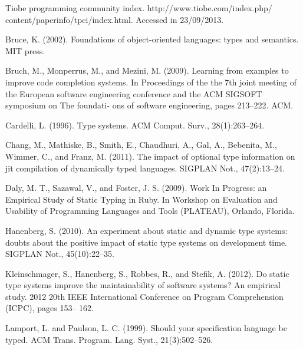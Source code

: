 \documentclass[preprint]{sigplanconf}
\begin{document}
%
%

\renewcommand{\bibfont}{\normalsize}
\begin{thebibliography}{}
\softraggedright

Tiobe programming community index. http://www.tiobe.com/index.php/ content/paperinfo/tpci/index.html. Accessed in 23/09/2013.

Bruce, K. (2002). Foundations of object-oriented languages: types and semantics. MIT press.

Bruch, M., Monperrus, M., and Mezini, M. (2009). Learning from examples to improve code completion systems. In Proceedings of the the 7th joint meeting of the European software engineering conference and the ACM SIGSOFT symposium on The foundati- ons of software engineering, pages 213–222. ACM.

Cardelli, L. (1996). Type systems. ACM Comput. Surv., 28(1):263–264.

Chang, M., Mathiske, B., Smith, E., Chaudhuri, A., Gal, A., Bebenita, M., Wimmer, C., and Franz, M. (2011). The impact of optional type information on jit compilation of dynamically typed languages. SIGPLAN Not., 47(2):13–24.

Daly, M. T., Sazawal, V., and Foster, J. S. (2009). Work In Progress: an Empirical Study of Static Typing in Ruby. In Workshop on Evaluation and Usability of Programming Languages and Tools (PLATEAU), Orlando, Florida.

Hanenberg, S. (2010). An experiment about static and dynamic type systems: doubts about the positive impact of static type systems on development time. SIGPLAN Not., 45(10):22–35.

Kleinschmager, S., Hanenberg, S., Robbes, R., and Stefik, A. (2012). Do static type systems improve the maintainability of software systems? An empirical study. 2012 20th IEEE International Conference on Program Comprehension (ICPC), pages 153– 162.

Lamport, L. and Paulson, L. C. (1999). Should your specification language be typed. ACM Trans. Program. Lang. Syst., 21(3):502–526.


\end{thebibliography}
\end{document}

